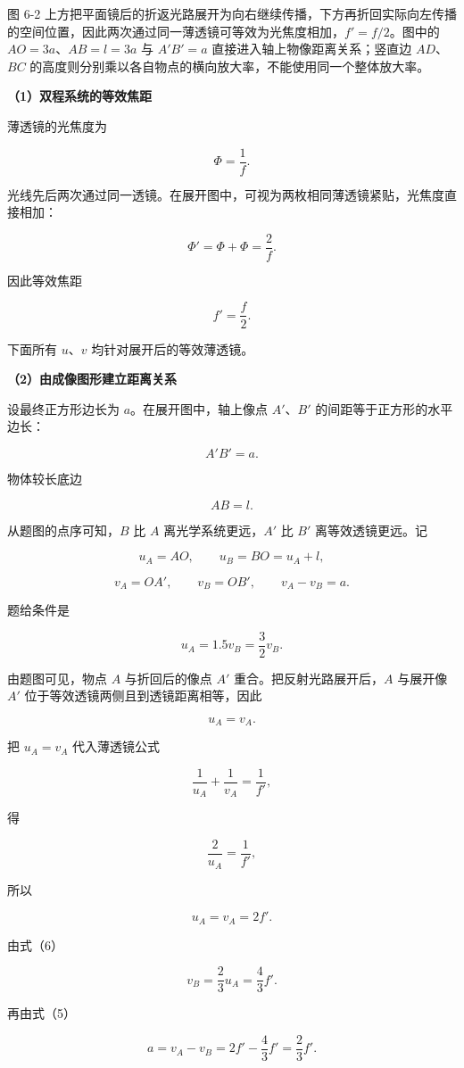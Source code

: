 \documentclass[12pt,a4paper,UTF8]{ctexart}
\begin{document}
图 6-2
上方把平面镜后的折返光路展开为向右继续传播，下方再折回实际向左传播的空间位置，因此两次通过同一薄透镜可等效为光焦度相加，\(f'=f/2\)。图中的
\(AO=3a\)、\(AB=l=3a\) 与 \(A'B'=a\) 直接进入轴上物像距离关系；竖直边
\(AD\)、\(BC\)
的高度则分别乘以各自物点的横向放大率，不能使用同一个整体放大率。

\textbf{（1）双程系统的等效焦距}

薄透镜的光焦度为

\[
\Phi=\frac1f.
\]

光线先后两次通过同一透镜。在展开图中，可视为两枚相同薄透镜紧贴，光焦度直接相加：

\[
\Phi'=\Phi+\Phi=\frac2f.
\]

因此等效焦距

\[
\boxed{f'=\frac f2}.
\tag{1}
\]

下面所有 \(u\)、\(v\) 均针对展开后的等效薄透镜。

\textbf{（2）由成像图形建立距离关系}

设最终正方形边长为 \(a\)。在展开图中，轴上像点 \(A'\)、\(B'\)
的间距等于正方形的水平边长：

\[
A'B'=a.
\tag{2}
\]

物体较长底边

\[
AB=l.
\tag{3}
\]

从题图的点序可知，\(B\) 比 \(A\) 离光学系统更远，\(A'\) 比 \(B'\)
离等效透镜更远。记

\[
u_A=AO,
\qquad
u_B=BO=u_A+l,
\tag{4}
\]

\[
v_A=OA',
\qquad
v_B=OB',
\qquad
v_A-v_B=a.
\tag{5}
\]

题给条件是

\[
u_A=1.5v_B=\frac32v_B.
\tag{6}
\]

由题图可见，物点 \(A\) 与折回后的像点 \(A'\)
重合。把反射光路展开后，\(A\) 与展开像 \(A'\)
位于等效透镜两侧且到透镜距离相等，因此

\[
u_A=v_A.
\tag{7}
\]

把 \(u_A=v_A\) 代入薄透镜公式

\[
\frac1{u_A}+\frac1{v_A}=\frac1{f'},
\]

得

\[
\frac2{u_A}=\frac1{f'},
\]

所以

\[
u_A=v_A=2f'.
\tag{8}
\]

由式（6）

\[
v_B=\frac23u_A=\frac43f'.
\tag{9}
\]

再由式（5）

\[
a=v_A-v_B
=2f'-\frac43f'
=\frac23f'.
\tag{10}
\]
\end{document}
